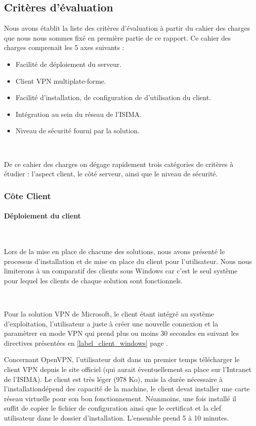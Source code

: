 \subsection{Critères d'évaluation}

Nous avons établit la liste des critères d'évaluation à partir du cahier des charges que nous nous sommes fixé en première partie de ce rapport. Ce cahier des charges comprenait les 5 axes suivants :
\begin{itemize}
 	\item Facilité de déploiement du serveur.
	\item Client VPN multiplate-forme.
	\item Facilité d'installation, de configuration de d'utilisation du client.
	\item Intégration au sein du réseau de l'ISIMA.
	\item Niveau de sécurité fourni par la solution.
\end{itemize}
~

De ce cahier des charges on dégage rapidement trois catégories de critères à étudier : l'aspect client, le côté serveur, ainsi que le niveau de sécurité.

\subsubsection{Côte Client}

\paragraph{Déploiement du client}
~

Lors de la mise en place de chacune des solutions, nous avons présenté le processus d'installation et de mise en place du client pour l'utilisateur. Nous nous limiterons à un comparatif des clients sous Windows car c'est le seul système pour lequel les clients de chaque solution sont fonctionnels.

~

Pour la solution VPN de Microsoft, le client étant intégré au système d'exploitation, l'utilisateur a juste à créer une nouvelle connexion et la paramètrer en mode VPN qui prend plus ou moins 30 secondes en suivant les directives présentées en \ref{label_client_windows} page \pageref{label_client_windows}.

Concernant OpenVPN, l'utilisateur doit dans un premier temps télécharger le client VPN depuis le site officiel (qui aurait éventuellement sa place sur l'Intranet de l'ISIMA). Le client est très léger (978 Ko), mais la durée nécessaire à l'installationdépend des capacité de la machine, le client devat installer une carte réseau virtuelle pour son bon fonctionnement. Néanmoins, une fois installé il suffit de copier le fichier de configuration ainsi que le certificat et la clef utilisateur dans le dossier d'installation. L'ensemble prend 5 à 10 minutes.

